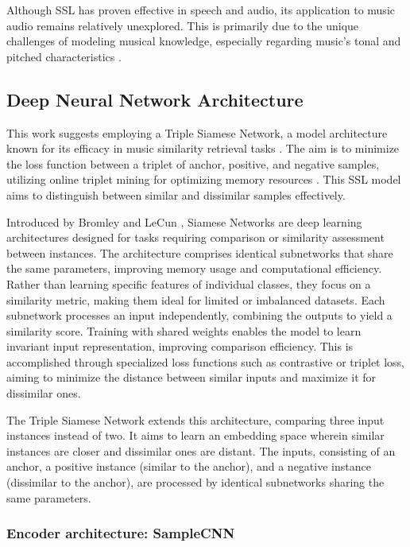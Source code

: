 Although SSL has proven effective in speech and audio, its application to music audio remains relatively unexplored. This is primarily due to the unique challenges of modeling musical knowledge, especially regarding music's tonal and pitched characteristics \cite{Li2023MERT:Training}.

\subsection{Deep Neural Network Architecture}

This work suggests employing a Triple Siamese Network, a model architecture known for its efficacy in music similarity retrieval tasks \cite{contentmusicsimtriplet2020}. The aim is to minimize the loss function between a triplet of anchor, positive, and negative samples, utilizing online triplet mining for optimizing memory resources \cite{Sikaroudi2020OfflinePatches}. This SSL model aims to distinguish between similar and dissimilar samples effectively.

Introduced by Bromley and LeCun \cite{Bromley1993SignatureNetwork}, Siamese Networks are deep learning architectures designed for tasks requiring comparison or similarity assessment between instances. The architecture comprises identical subnetworks that share the same parameters, improving memory usage and computational efficiency. Rather than learning specific features of individual classes, they focus on a similarity metric, making them ideal for limited or imbalanced datasets. Each subnetwork processes an input independently, combining the outputs to yield a similarity score. Training with shared weights enables the model to learn invariant input representation, improving comparison efficiency. This is accomplished through specialized loss functions such as contrastive or triplet loss, aiming to minimize the distance between similar inputs and maximize it for dissimilar ones.

The Triple Siamese Network extends this architecture, comparing three input instances instead of two. It aims to learn an embedding space wherein similar instances are closer and dissimilar ones are distant. The inputs, consisting of an anchor, a positive instance (similar to the anchor), and a negative instance (dissimilar to the anchor), are processed by identical subnetworks sharing the same parameters.

\subsubsection{Encoder architecture: SampleCNN}


